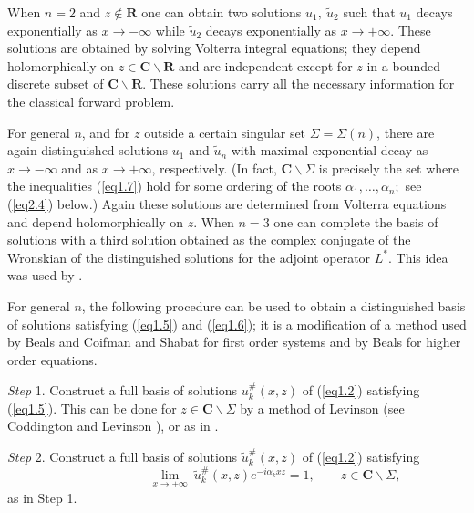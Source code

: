 \documentclass{surv-l}
\theoremstyle{plain}
\theoremstyle{definition}
\numberwithin{equation}{chapter}
\begin{document}
When $n=2$ and $z\not\in \mathbf{R}$ one can obtain two solutions $u_{1},\ \tilde{u}_{2}$ such that $u_{1}$ decays exponentially as $ x\rightarrow-\infty$ while $\tilde{u}_{2}$ decays exponentially as $ x\rightarrow+\infty$. These solutions are obtained by solving Volterra integral equations; they depend holomorphically on $z\in \mathbf{C}\backslash \mathbf{R}$ and are independent except for $z$ in a bounded discrete subset of $\mathbf{C}\backslash \mathbf{R}$. These solutions carry all the necessary information for the classical forward problem.

For general $n$, and for $z$ outside a certain singular set $\Sigma=\Sigma(n)$, there are again distinguished solutions $u_{1}$ and $\tilde{u}_{n}$ with maximal exponential decay as $ x\rightarrow-\infty$ and as $ x\rightarrow+\infty$, respectively. (In fact, $ \mathbf{C}\backslash \Sigma$ is precisely the set where the inequalities (\ref{eq1.7}) hold for some ordering of the roots $\alpha_{1}, \ldots, \alpha_{n};$ see (\ref{eq2.4}) below.) Again these solutions are determined from Volterra equations and depend holomorphically on $z$. When $n=3$ one can complete the basis of solutions with a third solution obtained as the complex conjugate of the Wronskian of the distinguished solutions for the adjoint operator $L^{*}$. This idea was used by \cite{DTT, Ka, McK}.

For general $n$, the following procedure can be used to obtain a distinguished basis of solutions satisfying (\ref{eq1.5}) and (\ref{eq1.6}); it is a modification of a method used by Beals and Coifman \cite{BC1} and Shabat \cite{Sh} for first order systems and by Beals \cite{Be} for higher order equations.

\emph{Step} 1. Construct a full basis of solutions $u_{k}^{\#}(x,z)$ of (\ref{eq1.2}) satisfying (\ref{eq1.5}). This can be done for $ z\in \mathbf{C}\backslash \Sigma$ by a method of Levinson (see Coddington and Levinson \cite[p. 104, problem 29]{CL}), or as in \cite{Be, BC1}.

\emph{Step} 2. Construct a full basis of solutions $\tilde{u}_{k}^{\#}(x,z)$ of (\ref{eq1.2}) satisfying
\begin{equation*}\label{eq1.5'}
\tag{(1.5)$'$}\qquad\qquad \qquad\lim_{x\rightarrow+\infty}\ \tilde{u}_{k}^{\#}(x,z)e^{-i\alpha_{k}xz}=1,\qquad  z\in \mathbf{C}\backslash \Sigma,
\end{equation*}
as in Step 1.
\end{document}
